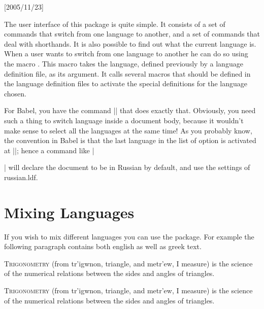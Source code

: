 \begin{multicols}{2}
\begin{teXX}
\usepackage[utf8]{inputenc} %
\usepackage[polutonikogreek,
greek, english]{babel}[2005/11/23]
\end{teXX}


The user interface of this package is quite simple. It consists of a set of commands
that switch from one language to another, and a set of commands that deal with
shorthands. It is also possible to find out what the current language is.
When a user wants to switch from one language to another he can do so using
the macro . This macro takes the language, defined previously
by a language definition file, as its argument. It calls several macros that should
be defined in the language definition files to activate the special definitions for the language chosen.

For Babel, you have the command |\selectlanguage| that does exactly that. Obviously, you need such a thing to switch language inside a document body, because it wouldn't make sense to select all the languages at the same time! As you probably know, the convention in Babel is that the last language in the list of option is activated at ||; hence a command like |\usepackage[french,russian]{babel}| will declare the document to be in Russian by default, and use the settings of russian.ldf.


\section{Mixing Languages}
If you wish to mix different languages you can use the  package. For example the following
paragraph contains both english as well as greek text.
\medskip



\topline

\textsc{Trigonometry} (from \textgreek{tr'igwnon}, triangle, and \textgreek{metr'ew}, I measure)
is the science of the numerical relations between the
sides and angles of triangles.

\bottomline

\begin{teXXX}
\textsc{Trigonometry} (from \textgreek{tr'igwnon}, triangle,
and \textgreek{metr'ew}, I measure)
is the science of the numerical relations between the
sides and angles of triangles.
\end{teXXX}



\end{multicols}
